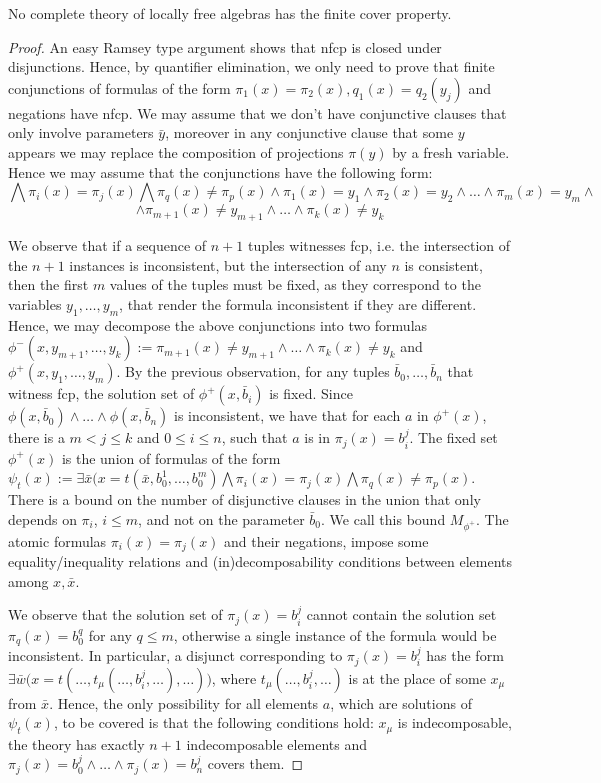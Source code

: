 \documentclass[a4paper,11pt]{article}
\begin{document}
\begin{theorem}\label{NFCP}
No complete theory of locally free algebras has the finite cover property.
\end{theorem}
\begin{proof}
An easy Ramsey type argument shows that nfcp is closed under disjunctions. Hence, by quantifier elimination,  we only need to prove that finite conjunctions of formulas of the form $\pi_1(x)=\pi_2(x), q_1(x)=q_2(y_j)$ and negations have nfcp. We may assume that we don't have conjunctive clauses that only involve parameters $\bar y$, moreover in any conjunctive clause that some $y$ appears we may replace the composition of projections $\pi(y)$ by a fresh variable. Hence we may assume that the conjunctions have the following form: $$\bigwedge \pi_i(x)=\pi_j(x)\bigwedge \pi_q(x)\neq \pi_p(x) \land \pi_1(x)=y_1\land \pi_2(x)=y_2\land\ldots\land\pi_m(x)=y_m\land $$ $$ \land \pi_{m+1}(x)\neq y_{m+1}\land\ldots\land\pi_k(x)\neq y_k$$ 

We observe that if a sequence of $n+1$ tuples witnesses fcp, i.e. the intersection of the $n+1$ instances is inconsistent, but the intersection of any $n$ is consistent, then the first $m$ values of the tuples must be fixed, as they correspond to the variables $y_1, \dots, y_m$, that render the formula inconsistent if they are different. Hence, we may decompose the above conjunctions into two formulas $\phi^-(x,y_{m+1}, \ldots, y_k):=\pi_{m+1}(x)\neq y_{m+1}\land\ldots\land\pi_k(x)\neq y_k$ and $\phi^+(x,y_1, \ldots, y_m)$. By the previous observation, for any tuples $\bar b_0, \ldots, \bar b_n$ that witness fcp, the solution set of $\phi^{+}(x,\bar b_i)$ is fixed.  Since $\phi(x,\bar b_0)\land\ldots\land\phi(x, \bar b_n)$ is inconsistent, we have that for each $a$ in $\phi^+(x)$, there is a $m< j \leq k$ and $0\leq i\leq n$, such that $a$ is in $\pi_j(x)=b_i^j$. The fixed set $\phi^{+}(x)$ is the union of formulas of the form $\psi_t(x):=\exists \bar x (x=t(\bar x, b_0^1, \ldots, b_0^m)\bigwedge \pi_i(x)=\pi_j(x)\bigwedge \pi_q(x)\neq \pi_p(x)$. There is a bound on the number of disjunctive clauses in the union that only depends on $\pi_i$, $i\leq m$, and not on the parameter $\bar b_0$. We call this bound $M_{\phi^+}$. The atomic formulas $\pi_i(x)=\pi_j(x)$ and their negations, impose some equality/inequality relations and (in)decomposability conditions between elements among $x, \bar x$. 

We observe that the solution set of $\pi_j(x)=b_i^j$ cannot contain the solution set $\pi_q(x)=b_0^q$ for any $q\leq m$, otherwise a single instance of the formula would be inconsistent. In particular, a disjunct corresponding to $\pi_j(x)=b_i^j$ has the form $\exists \bar w \big(x=t(\ldots, t_\mu(\ldots,b_i^j,\ldots), \ldots)\big)$, where $t_\mu(\ldots,b_i^j,\ldots)$ is at the place of some $x_\mu$ from $\bar x$. Hence, the only possibility for all elements $a$, which are solutions of $\psi_t(x)$, to be covered is that the following conditions hold: $x_\mu$ is indecomposable, the theory has exactly $n+1$ indecomposable elements and $\pi_j(x)=b_0^j\land\ldots\land \pi_j(x)=b_n^j$ covers them. 


\end{proof}
\end{document}
